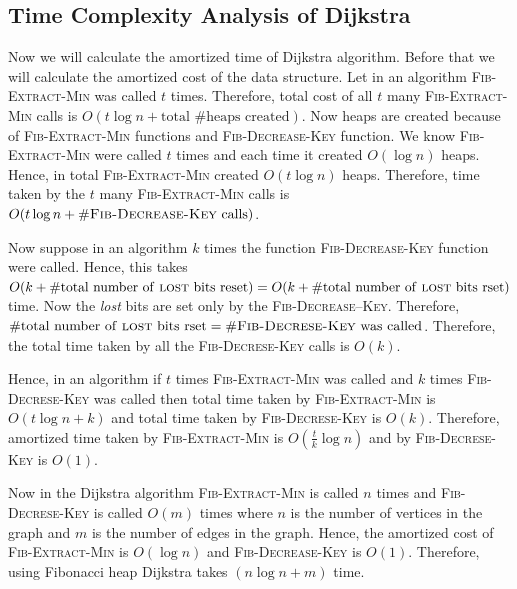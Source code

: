 \subsection{Time Complexity Analysis of Dijkstra}

Now we will calculate the amortized time of Dijkstra algorithm. Before that we will calculate the amortized cost of the data structure. Let in an algorithm  \textsc{Fib-Extract-Min} was called $t$ times. Therefore, total cost of all $t$ many \textsc{Fib-Extract-Min} calls is $O(t\log n+\text{total $\#$heaps created})$. Now heaps are created because of \textsc{Fib-Extract-Min} functions and \textsc{Fib-Decrease-Key} function. We know \textsc{Fib-Extract-Min} were called $t$ times and each time it created $O(\log n)$ heaps. Hence, in total \textsc{Fib-Extract-Min} created $O(t\log n)$ heaps. Therefore, time taken by the $t$ many \textsc{Fib-Extract-Min} calls is $O(t\log n+\#\textsc{Fib-Decrease-Key}\text{ calls})$.

Now suppose in an algorithm $k$ times the function \textsc{Fib-Decrease-Key} function were called. Hence, this takes $O(k+\#\text{total number of \textsc{lost} bits reset})=O(k+\#\text{total number of \textsc{lost} bits rset})$ time. Now the \emph{lost} bits are set only by the \textsc{Fib-Decrease--Key}. Therefore, $\#\text{total number of \textsc{lost} bits rset}=\#\text{\textsc{Fib-Decrese-Key} was called}$. Therefore, the total time taken by all the \textsc{Fib-Decrese-Key} calls is $O(k)$.

Hence, in an algorithm if $t$ times \textsc{Fib-Extract-Min} was called and $k$ times \textsc{Fib-Decrese-Key} was called then total time taken by \textsc{Fib-Extract-Min} is $O(t\log n+k)$ and total time taken by \textsc{Fib-Decrese-Key} is $O(k)$. Therefore, amortized time taken by \textsc{Fib-Extract-Min} is $O(\frac{t}{k}\log n)$ and by \textsc{Fib-Decrese-Key} is $O(1)$.

Now in the Dijkstra algorithm \textsc{Fib-Extract-Min} is called $n$ times and \textsc{Fib-Decrese-Key} is called $O(m)$ times where $n$ is the number of vertices in the graph and $m$ is the number of edges in the graph. Hence, the amortized cost of \textsc{Fib-Extract-Min} is $O(\log n)$ and \textsc{Fib-Decrease-Key} is $O(1)$. Therefore, using Fibonacci heap Dijkstra takes $(n\log n+m)$ time.
